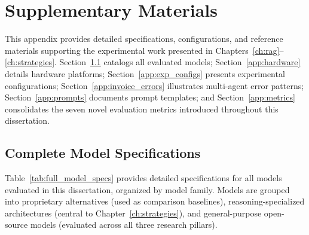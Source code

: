 \chapter{Supplementary Materials}
\label{app:supplementary}

This appendix provides detailed specifications, configurations, and reference materials supporting the experimental work presented in Chapters~\ref{ch:rag}--\ref{ch:strategies}. Section~\ref{app:model_specs} catalogs all evaluated models; Section~\ref{app:hardware} details hardware platforms; Section~\ref{app:exp_configs} presents experimental configurations; Section~\ref{app:invoice_errors} illustrates multi-agent error patterns; Section~\ref{app:prompts} documents prompt templates; and Section~\ref{app:metrics} consolidates the seven novel evaluation metrics introduced throughout this dissertation.

\section{Complete Model Specifications}
\label{app:model_specs}

Table~\ref{tab:full_model_specs} provides detailed specifications for all models evaluated in this dissertation, organized by model family. Models are grouped into proprietary alternatives (used as comparison baselines), reasoning-specialized architectures (central to Chapter~\ref{ch:strategies}), and general-purpose open-source models (evaluated across all three research pillars).

